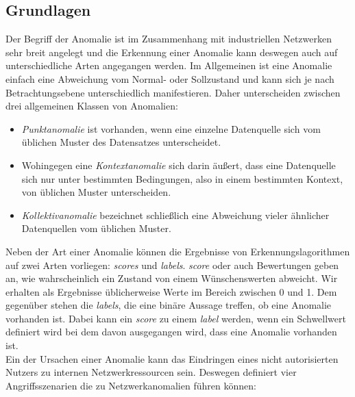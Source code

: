 \subsection{Grundlagen}
Der Begriff der Anomalie ist im Zusammenhang mit industriellen Netzwerken sehr breit angelegt und die Erkennung einer Anomalie kann deswegen auch auf unterschiedliche Arten angegangen werden. Im Allgemeinen ist eine Anomalie einfach eine Abweichung vom Normal- oder Sollzustand und kann sich je nach Betrachtungsebene unterschiedlich manifestieren. Daher unterscheiden \citet{ahmed2016survey} zwischen drei allgemeinen Klassen von Anomalien:
\begin{itemize}
\item \textit{Punktanomalie} ist vorhanden, wenn eine einzelne Datenquelle sich vom üblichen Muster des Datensatzes unterscheidet.
\item Wohingegen eine \textit{Kontextanomalie} sich darin äußert, dass eine Datenquelle sich nur unter bestimmten Bedingungen, also in einem bestimmten Kontext, von üblichen Muster unterscheiden.
\item \textit{Kollektivanomalie} bezeichnet schließlich eine Abweichung vieler ähnlicher Datenquellen vom üblichen Muster.
\end{itemize}
Neben der Art einer Anomalie können die Ergebnisse von Erkennungslagorithmen auf zwei Arten vorliegen: \textit{\Glspl{score}} und \textit{\Glspl{label}}. \textit{\Gls{score}} oder auch Bewertungen geben an, wie wahrscheinlich ein Zustand von einem Wünschenswerten abweicht. Wir erhalten als Ergebnisse üblicherweise Werte im Bereich zwischen 0 und 1. Dem gegenüber stehen die \textit{\Glspl{label}}, die eine binäre Aussage treffen, ob eine Anomalie vorhanden ist. Dabei kann ein \textit{\Gls{score}} zu einem \textit{\Gls{label}} werden, wenn ein Schwellwert definiert wird bei dem davon ausgegangen wird, dass eine Anomalie vorhanden ist. \cite[p. ~22]{ahmed2016survey}\\
Ein der Ursachen einer Anomalie kann das Eindringen eines nicht autorisierten Nutzers zu internen Netzwerkressourcen sein. Deswegen definiert \citet{ahmed2016survey} vier Angriffsszenarien die zu Netzwerkanomalien führen können:
